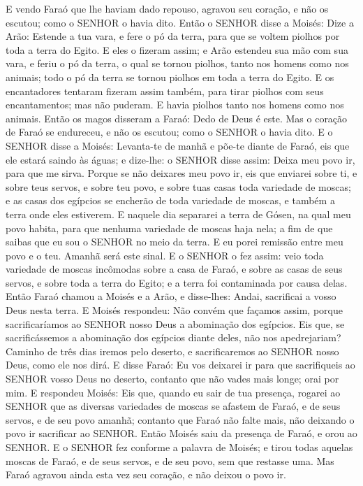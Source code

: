 {E vendo Faraó que lhe haviam dado repouso, agravou seu coração, e não os escutou; como o SENHOR o havia dito.
Então o SENHOR disse a Moisés: Dize a Arão: Estende a tua vara, e fere o pó da terra, para que se voltem piolhos por toda a terra do Egito.
E eles o fizeram assim; e Arão estendeu sua mão com sua vara, e feriu o pó da terra, o qual se tornou piolhos, tanto nos homens como nos animais; todo o pó da terra se tornou piolhos em toda a terra do Egito.
E os encantadores tentaram fizeram assim também, para tirar piolhos com seus encantamentos; mas não puderam. E havia piolhos tanto nos homens como nos animais.
Então os magos disseram a Faraó: Dedo de Deus é este. Mas o coração de Faraó se endureceu, e não os escutou; como o SENHOR o havia dito.
E o SENHOR disse a Moisés: Levanta-te de manhã e põe-te diante de Faraó, eis que ele estará saindo às águas; e dize-lhe: o SENHOR disse assim: Deixa meu povo ir, para que me sirva.
Porque se não deixares meu povo ir, eis que enviarei sobre ti, e sobre teus servos, e sobre teu povo, e sobre tuas casas toda variedade de moscas; e as casas dos egípcios se encherão de toda variedade de moscas, e também a terra onde eles estiverem.
E naquele dia separarei a terra de Gósen, na qual meu povo habita, para que nenhuma variedade de moscas haja nela; a fim de que saibas que eu sou o SENHOR no meio da terra.
E eu porei remissão entre meu povo e o teu. Amanhã será este sinal.
E o SENHOR o fez assim: veio toda variedade de moscas incômodas sobre a casa de Faraó, e sobre as casas de seus servos, e sobre toda a terra do Egito; e a terra foi contaminada por causa delas.
Então Faraó chamou a Moisés e a Arão, e disse-lhes: Andai, sacrificai a vosso Deus nesta terra.
E Moisés respondeu: Não convém que façamos assim, porque sacrificaríamos ao SENHOR nosso Deus a abominação dos egípcios. Eis que, se sacrificássemos a abominação dos egípcios diante deles, não nos apedrejariam?
Caminho de três dias iremos pelo deserto, e sacrificaremos ao SENHOR nosso Deus, como ele nos dirá.
E disse Faraó: Eu vos deixarei ir para que sacrifiqueis ao SENHOR vosso Deus no deserto, contanto que não vades mais longe; orai por mim.
E respondeu Moisés: Eis que, quando eu sair de tua presença, rogarei ao SENHOR que as diversas variedades de moscas se afastem de Faraó, e de seus servos, e de seu povo amanhã; contanto que Faraó não falte mais, não deixando o povo ir sacrificar ao SENHOR.
Então Moisés saiu da presença de Faraó, e orou ao SENHOR.
E o SENHOR fez conforme a palavra de Moisés; e tirou todas aquelas moscas de Faraó, e de seus servos, e de seu povo, sem que restasse uma.
Mas Faraó agravou ainda esta vez seu coração, e não deixou o povo ir.

}

